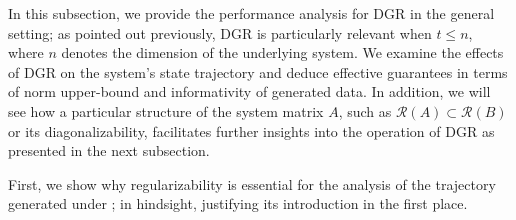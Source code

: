 \documentclass[journal]{IEEEtran}
\theoremstyle{definition}
\theoremstyle{remark}
\begin{document}
In this subsection, we provide the performance analysis for
\ac{DGR} in the general setting;
as pointed out previously,
\ac{DGR} is particularly relevant when $t\leq n$,
where $n$ denotes the dimension of the underlying system.
%
We examine the effects of \ac{DGR} on the system's state trajectory and deduce effective guarantees in terms of norm upper-bound and informativity of generated data.
%
In addition, we will see how a particular structure of the system
matrix $A$, such as $\mathcal{R}(A)\subset\mathcal{R}(B)$ or its diagonalizability, facilitates
further insights into the operation of \ac{DGR} as presented in the next subsection.



%
    First, we show why regularizability is essential for the analysis of the trajectory generated under ; in hindsight, justifying its introduction in the first place.
\end{document}
